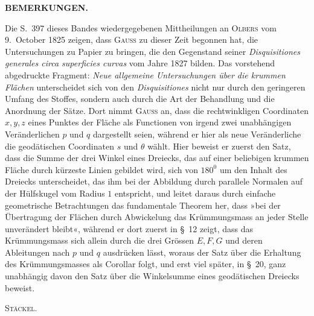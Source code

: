 %
\par{}\begin{center}\textbf{BEMERKUNGEN.}\end{center}
\noindent\hspace*{1.2em}Die S.\ 397 dieses Bandes wiedergegebenen Mittheilungen an \textsc{Olbers} vom 9.\ October 1825 zeigen, dass \textsc{Gauss} zu dieser Zeit begonnen hat, die Untersuchungen zu Papier zu bringen, die den Gegenstand seiner \textit{Disquisitiones generales circa superficies curvas} vom Jahre 1827 bilden. Das vorstehend abgedruckte Fragment: \textit{Neue allgemeine Untersuchungen über die krummen Flächen} unterscheidet sich von den \textit{Disquisitiones} nicht nur durch den geringeren Umfang des Stoffes, sondern auch durch die Art der Behandlung und die Anordnung der Sätze. Dort nimmt \textsc{Gauss} an, dass die rechtwinkligen Coordinaten $x,y,z$ eines Punktes der Fläche als Functionen von irgend zwei unabhängigen Veränderlichen $p$ und $q$ dargestellt seien, während er hier als neue Veränderliche die geodätischen Coordinaten $s$ und $\theta$ wählt. Hier beweist er zuerst den Satz, dass die Summe der drei Winkel eines Dreiecks, das auf einer beliebigen krummen Fläche durch kürzeste Linien gebildet wird, sich von $180^{0}$ um den Inhalt des Dreiecks unterscheidet, das ihm bei der Abbildung durch parallele Normalen auf der Hülfskugel vom Radius $1$ entspricht, und leitet daraus durch einfache geometrische Betrachtungen das fundamentale Theorem her, dass »bei der Übertragung der Flächen durch Abwickelung das Krümmungsmass an jeder Stelle unverändert bleibt«, während er dort zuerst in \S\ 12 zeigt, dass das Krümmungsmass sich allein durch die drei Grössen $E,F,G$ und deren Ableitungen nach $p$ und $q$ ausdrücken lässt, woraus der Satz über die Erhaltung des Krümmungsmasses als Corollar folgt, und erst viel später, in \S\ 20, ganz unabhängig davon den Satz über die Winkelsumme eines geodätischen Dreiecks beweist.
\begin{flushright}\textsc{Stäckel}.\end{flushright}

